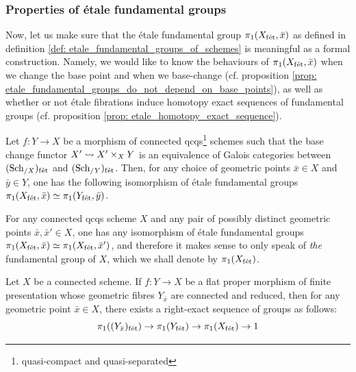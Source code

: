         \subsubsection{Properties of \'etale fundamental groups}
            Now, let us make sure that the \'etale fundamental group $\pi_1(X_{\mathrm{f\acute{e}t}}, \bar{x})$ as defined in definition \ref{def: etale_fundamental_groups_of_schemes} is meaningful as a formal construction. Namely, we would like to know the behaviours of $\pi_1(X_{\mathrm{f\acute{e}t}}, \bar{x})$ when we change the base point and when we base-change (cf. proposition \ref{prop: etale_fundamental_groups_do_not_depend_on_base_points}), as well as whether or not \'etale fibrations induce homotopy exact sequences of fundamental groups (cf. proposition \ref{prop: etale_homotopy_exact_sequence}). 
            \begin{proposition} \label{prop: etale_fundamental_groups_do_not_depend_on_base_points}
                \cite[\href{https://stacks.math.columbia.edu/tag/0BQA}{Tag 0BQA}]{stacks} Let $f: Y \to X$ be a morphism of connected qcqs\footnote{quasi-compact and quasi-separated} schemes such that the base change functor $X' \mapsto X' \x_X Y$ is an equivalence of Galois categories between $(\mathrm{Sch}_{/X})_{\mathrm{f\acute{e}t}}$ and $(\mathrm{Sch}_{/Y})_{\mathrm{f\acute{e}t}}$. Then, for any choice of geometric points $\bar{x} \in X$ and $\bar{y} \in Y$, one has the following isomorphism of \'etale fundamental groups $\pi_1(X_{\mathrm{f\acute{e}t}}, \bar{x}) \simeq \pi_1(Y_{\mathrm{f\acute{e}t}}, \bar{y})$.
            \end{proposition}
            \begin{corollary} \label{coro: etale_fundamental_group_uniqueness}
                For any connected qcqs scheme $X$ and any pair of possibly distinct geometric points $\bar{x}, \bar{x}' \in X$, one has any isomorphism of \'etale fundamental groups $\pi_1(X_{\mathrm{f\acute{e}t}}, \bar{x}) \simeq \pi_1(X_{\mathrm{f\acute{e}t}}, \bar{x}')$, and therefore it makes sense to only speak of \textit{the} fundamental group of $X$, which we shall denote by $\pi_1(X_{\mathrm{f\acute{e}t}})$.
            \end{corollary}
            
            \begin{proposition} \label{prop: etale_homotopy_exact_sequence}
                \cite[\href{https://stacks.math.columbia.edu/tag/0C0J}{Tag 0C0J}]{stacks} Let $X$ be a connected scheme. If $f: Y \to X$ be a flat proper morphism of finite presentation whose geometric fibres $Y_{\bar{x}}$ are connected and reduced, then for any geometric point $\bar{x} \in X$, there exists a right-exact sequence of groups as follows:
                    $$\pi_1((Y_{\bar{x}})_{\mathrm{f\acute{e}t}}) \to \pi_1(Y_{\mathrm{f\acute{e}t}}) \to \pi_1(X_{\mathrm{f\acute{e}t}}) \to 1$$
            \end{proposition}
    
